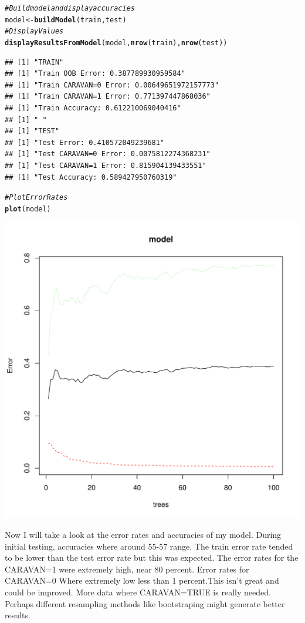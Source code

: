 \documentclass{article}\usepackage[]{graphicx}\usepackage[]{color}
\makeatletter
\def\maxwidth{ %
  \ifdim\Gin@nat@width>\linewidth
    \linewidth
  \else
    \Gin@nat@width
  \fi
}
\newcommand{\hlcom}[1]{\textcolor[rgb]{0.678,0.584,0.686}{\textit{#1}}}%
\newcommand{\hlstd}[1]{\textcolor[rgb]{0.345,0.345,0.345}{#1}}%
\newcommand{\hlkwb}[1]{\textcolor[rgb]{0.69,0.353,0.396}{#1}}%
\newcommand{\hlkwd}[1]{\textcolor[rgb]{0.737,0.353,0.396}{\textbf{#1}}}%
\newenvironment{kframe}{%
 \def\at@end@of@kframe{}%
 \ifinner\ifhmode%
  \def\at@end@of@kframe{\end{minipage}}%
  \begin{minipage}{\columnwidth}%
 \fi\fi%
 \def\FrameCommand##1{\hskip\@totalleftmargin \hskip-\fboxsep
 \colorbox{shadecolor}{##1}\hskip-\fboxsep
     \hskip-\linewidth \hskip-\@totalleftmargin \hskip\columnwidth}%
 \MakeFramed {\advance\hsize-\width
   \@totalleftmargin\z@ \linewidth\hsize
   \@setminipage}}%
 {\par\unskip\endMakeFramed%
 \at@end@of@kframe}
\newenvironment{knitrout}{}{} %
\makeatother
\begin{document}
\begin{knitrout}
\color{fgcolor}\begin{kframe}
\begin{alltt}
\hlcom{#Build model and display accuracies }
\hlstd{model}\hlkwb{<-}\hlkwd{buildModel}\hlstd{(train,test)}
\hlcom{#Display Values}
\hlkwd{displayResultsFromModel}\hlstd{(model,}\hlkwd{nrow}\hlstd{(train),}\hlkwd{nrow}\hlstd{(test))}
\end{alltt}
\begin{verbatim}
## [1] "TRAIN"
## [1] "Train OOB Error: 0.387789930959584"
## [1] "Train CARAVAN=0 Error: 0.00649651972157773"
## [1] "Train CARAVAN=1 Error: 0.771397447868036"
## [1] "Train Accuracy: 0.612210069040416"
## [1] " "
## [1] "TEST"
## [1] "Test Error: 0.410572049239681"
## [1] "Test CARAVAN=0 Error: 0.0075812274368231"
## [1] "Test CARAVAN=1 Error: 0.815904139433551"
## [1] "Test Accuracy: 0.589427950760319"
\end{verbatim}
\begin{alltt}
\hlcom{#Plot Error Rates}
\hlkwd{plot}\hlstd{(model)}
\end{alltt}
\end{kframe}
\includegraphics[width=\maxwidth]{figure/unnamed-chunk-28-1} 

\end{knitrout}
Now I will take a look at the error rates and accuracies of my model. During initial testing, accuracies where around 55-57 range. The train error rate tended to be lower than the test error rate but this was expected. The error rates for the CARAVAN=1 were extremely high, near 80 percent. Error rates for CARAVAN=0 Where extremely low less than 1 percent.This isn't great and could be improved. More data where CARAVAN=TRUE is really needed. Perhaps different resampling methods like bootstraping might generate better results. 
\end{document}

